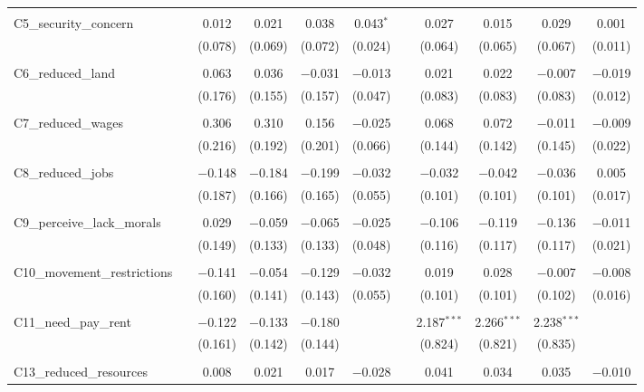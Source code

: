 \begin{table}[H]
\begin{tabular}{@{\extracolsep{4pt}}lcccccccccc}
  & & & & & & & & & & \\ 
 C5\_security\_concern &  & 0.012 & 0.021 & 0.038 & 0.043$^{*}$ &  & 0.027 & 0.015 & 0.029 & 0.001 \\ 
  &  & (0.078) & (0.069) & (0.072) & (0.024) &  & (0.064) & (0.065) & (0.067) & (0.011) \\ 
  & & & & & & & & & & \\ 
 C6\_reduced\_land &  & 0.063 & 0.036 & $-$0.031 & $-$0.013 &  & 0.021 & 0.022 & $-$0.007 & $-$0.019 \\ 
  &  & (0.176) & (0.155) & (0.157) & (0.047) &  & (0.083) & (0.083) & (0.083) & (0.012) \\ 
  & & & & & & & & & & \\ 
 C7\_reduced\_wages &  & 0.306 & 0.310 & 0.156 & $-$0.025 &  & 0.068 & 0.072 & $-$0.011 & $-$0.009 \\ 
  &  & (0.216) & (0.192) & (0.201) & (0.066) &  & (0.144) & (0.142) & (0.145) & (0.022) \\ 
  & & & & & & & & & & \\ 
 C8\_reduced\_jobs &  & $-$0.148 & $-$0.184 & $-$0.199 & $-$0.032 &  & $-$0.032 & $-$0.042 & $-$0.036 & 0.005 \\ 
  &  & (0.187) & (0.166) & (0.165) & (0.055) &  & (0.101) & (0.101) & (0.101) & (0.017) \\ 
  & & & & & & & & & & \\ 
 C9\_perceive\_lack\_morals &  & 0.029 & $-$0.059 & $-$0.065 & $-$0.025 &  & $-$0.106 & $-$0.119 & $-$0.136 & $-$0.011 \\ 
  &  & (0.149) & (0.133) & (0.133) & (0.048) &  & (0.116) & (0.117) & (0.117) & (0.021) \\ 
  & & & & & & & & & & \\ 
 C10\_movement\_restrictions &  & $-$0.141 & $-$0.054 & $-$0.129 & $-$0.032 &  & 0.019 & 0.028 & $-$0.007 & $-$0.008 \\ 
  &  & (0.160) & (0.141) & (0.143) & (0.055) &  & (0.101) & (0.101) & (0.102) & (0.016) \\ 
  & & & & & & & & & & \\ 
 C11\_need\_pay\_rent &  & $-$0.122 & $-$0.133 & $-$0.180 &  &  & 2.187$^{***}$ & 2.266$^{***}$ & 2.238$^{***}$ &  \\ 
  &  & (0.161) & (0.142) & (0.144) &  &  & (0.824) & (0.821) & (0.835) &  \\ 
  & & & & & & & & & & \\ 
 C13\_reduced\_resources &  & 0.008 & 0.021 & 0.017 & $-$0.028 &  & 0.041 & 0.034 & 0.035 & $-$0.010 \\ 

\end{tabular}
\end{table}
